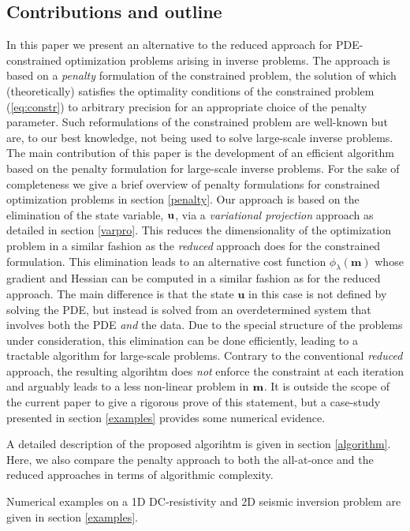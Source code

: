 \documentclass{iopart}
\begin{document}
\subsection{Contributions and outline}
In this paper we present an alternative to the reduced approach 
for PDE-constrained optimization problems arising in inverse problems.
The approach is based on a \emph{penalty} formulation of the constrained problem, 
the solution of which (theoretically) satisfies the optimality conditions of the constrained problem (\ref{eq:constr}) 
to arbitrary precision for an appropriate choice of the penalty parameter.
Such reformulations of the constrained problem are well-known but are, to our best knowledge, 
not being used to solve large-scale inverse problems.
The main contribution of this paper is the development of an efficient algorithm based on the penalty formulation
for large-scale inverse problems. For the sake of completeness we give a brief overview of penalty formulations
for constrained optimization problems in section \ref{penalty}.
Our approach is based on the elimination of the state variable, $\mathbf{u}$, via
a \emph{variational projection} approach as detailed in section \ref{varpro}. This reduces the dimensionality of the optimization problem in 
a similar fashion as the \emph{reduced} approach does for the constrained formulation.
This elimination leads to an alternative cost 
function $\phi_{\lambda}(\mathbf{m})$ whose gradient and Hessian can be computed in a similar fashion as for the reduced approach.
The main difference is that the state $\mathbf{u}$ in this case is not defined by solving the PDE, but instead is solved from an overdetermined
system that involves both the PDE \emph{and} the data. Due to the special structure of the problems under consideration, this elimination 
can be done efficiently, leading to a tractable algorithm for large-scale problems. 
Contrary to the conventional \emph{reduced} approach, the resulting algorihtm does \emph{not} enforce the constraint
at each iteration and arguably leads to a less non-linear problem in $\mathbf{m}$. It is outside the scope of the current
paper to give a rigorous prove of this statement, but a case-study presented in section
 \ref{examples} provides some numerical evidence.
 
A detailed description of the proposed algorihtm is given in section \ref{algorithm}.
Here, we also compare the penalty approach to both the all-at-once and the
reduced approaches in terms of algorithmic complexity.

Numerical examples on a 1D DC-resistivity and 2D seismic inversion problem are given in section \ref{examples}.
\end{document}
